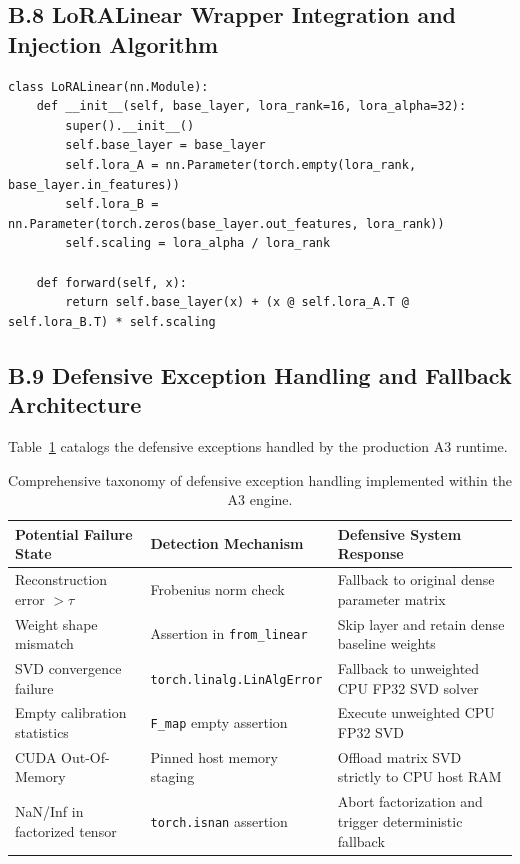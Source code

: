 \subsection{B.8 LoRALinear Wrapper Integration and Injection Algorithm}
\label{sec:app_lora_wrapper}

\begin{lstlisting}
class LoRALinear(nn.Module):
    def __init__(self, base_layer, lora_rank=16, lora_alpha=32):
        super().__init__()
        self.base_layer = base_layer
        self.lora_A = nn.Parameter(torch.empty(lora_rank, base_layer.in_features))
        self.lora_B = nn.Parameter(torch.zeros(base_layer.out_features, lora_rank))
        self.scaling = lora_alpha / lora_rank
        
    def forward(self, x):
        return self.base_layer(x) + (x @ self.lora_A.T @ self.lora_B.T) * self.scaling
\end{lstlisting}

\subsection{B.9 Defensive Exception Handling and Fallback Architecture}
\label{sec:app_defensive_handling}

Table~\ref{tab:app_failure_responses} catalogs the defensive exceptions handled by the production A3 runtime.

\begin{table}[H]
\centering
\small
\begin{tabular}{lll}
\toprule
\textbf{Potential Failure State} & \textbf{Detection Mechanism} & \textbf{Defensive System Response} \\
\midrule
Reconstruction error $> \tau$ & Frobenius norm check & Fallback to original dense parameter matrix \\
Weight shape mismatch & Assertion in \texttt{from\_linear} & Skip layer and retain dense baseline weights \\
SVD convergence failure & \texttt{torch.linalg.LinAlgError} & Fallback to unweighted CPU FP32 SVD solver \\
Empty calibration statistics & \texttt{F\_map} empty assertion & Execute unweighted CPU FP32 SVD \\
CUDA Out-Of-Memory & Pinned host memory staging & Offload matrix SVD strictly to CPU host RAM \\
NaN/Inf in factorized tensor & \texttt{torch.isnan} assertion & Abort factorization and trigger deterministic fallback \\
\bottomrule
\end{tabular}
\caption{Comprehensive taxonomy of defensive exception handling implemented within the A3 engine.}
\label{tab:app_failure_responses}
\end{table}

